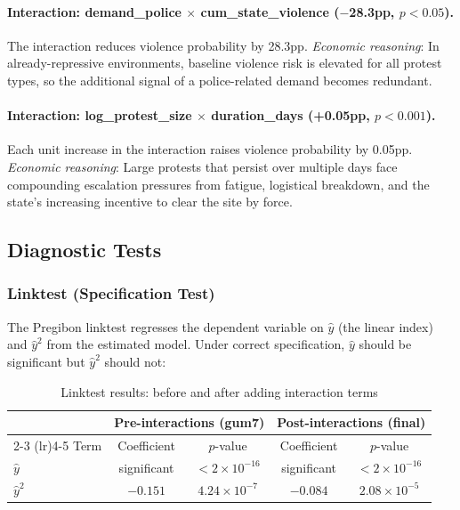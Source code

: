 \documentclass[12pt,a4paper]{article}
\begin{document}
\paragraph{Interaction: demand\_police $\times$ cum\_state\_violence ($-$28.3pp, $p < 0.05$).}
The interaction reduces violence probability by 28.3pp. \emph{Economic reasoning}: In already-repressive environments, baseline violence risk is elevated for all protest types, so the additional signal of a police-related demand becomes redundant.

\paragraph{Interaction: log\_protest\_size $\times$ duration\_days (+0.05pp, $p < 0.001$).}
Each unit increase in the interaction raises violence probability by 0.05pp. \emph{Economic reasoning}: Large protests that persist over multiple days face compounding escalation pressures from fatigue, logistical breakdown, and the state's increasing incentive to clear the site by force.

\subsection{Diagnostic Tests}
\label{sec:gof}

\subsubsection{Linktest (Specification Test)}

The Pregibon linktest regresses the dependent variable on $\hat{y}$ (the linear index) and $\hat{y}^2$ from the estimated model. Under correct specification, $\hat{y}$ should be significant but $\hat{y}^2$ should not:

\begin{table}[H]
\centering
\caption{Linktest results: before and after adding interaction terms}
\label{tab:linktest}
\begin{tabular}{lcccc}
\toprule
& \multicolumn{2}{c}{Pre-interactions (gum7)} & \multicolumn{2}{c}{Post-interactions (final)} \\
\cmidrule(lr){2-3} \cmidrule(lr){4-5}
Term & Coefficient & $p$-value & Coefficient & $p$-value \\
\midrule
$\hat{y}$ & significant & $< 2 \times 10^{-16}$ & significant & $< 2 \times 10^{-16}$ \\
$\hat{y}^2$ & $-0.151$ & $4.24 \times 10^{-7}$ & $-0.084$ & $2.08 \times 10^{-5}$ \\
\bottomrule
\end{tabular}
\end{table}
\end{document}
